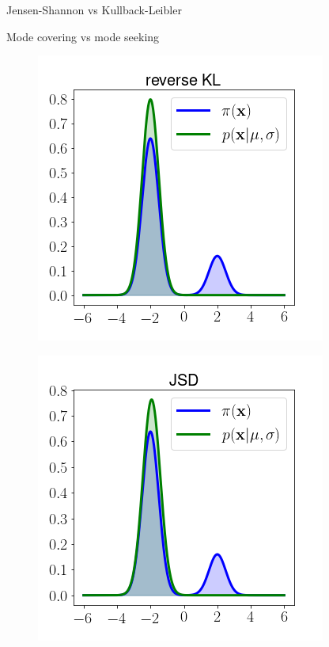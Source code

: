 \begin{frame}{Jensen-Shannon vs Kullback-Leibler }
\begin{block}{Mode covering vs mode seeking}
\begin{minipage}[t]{0.33\columnwidth}
\begin{figure}
				\includegraphics[width=\linewidth]{figs/reverse_KL}
			\end{figure}
	\end{minipage}%
	\begin{minipage}[t]{0.33\columnwidth}
			\begin{figure}
				\includegraphics[width=\linewidth]{figs/JSD}
			\end{figure}
	\end{minipage}
	\vspace{-0.3cm}
	\end{block}
\end{frame}

